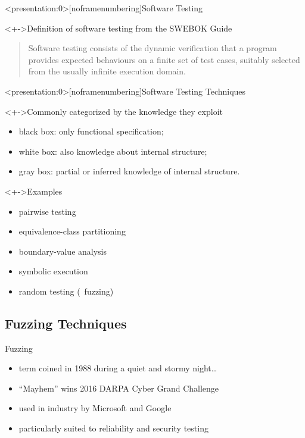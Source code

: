 \documentclass[handout]{beamer}
\begin{document}
\begin{frame}<presentation:0>[noframenumbering]{Software Testing}
    \begin{block}<+->{Definition of software testing from the SWEBOK Guide}
        \begin{quote}
            Software testing consists of the \alert{dynamic} verification that a
            program provides \alert{expected} behaviours on a \alert{finite} set
            of test cases, suitably \alert{selected} from the usually infinite
            execution domain.
        \end{quote}
    \end{block}
\end{frame}

\begin{frame}<presentation:0>[noframenumbering]{Software Testing Techniques}
    \begin{block}<+->{Commonly categorized by the knowledge they exploit}
        \begin{itemize}[<+->]
            \item{} black box: only functional specification;
            \item{} white box: also knowledge about internal structure;
            \item{} gray box: partial or inferred knowledge of internal structure.
        \end{itemize}
    \end{block}
    \begin{exampleblock}<+->{Examples}
        \begin{itemize}[<+->]
            \item{} pairwise testing
            \item{} equivalence-class partitioning
            \item{} boundary-value analysis
            \item{} symbolic execution
            \item{} random testing (\ie~\alert{fuzzing})
        \end{itemize}
    \end{exampleblock}
\end{frame}

\subsection{Fuzzing Techniques}

\begin{frame}{Fuzzing}
    \begin{itemize}[<+->]
        \item{} term coined in 1988 during a quiet and stormy night\ldots\
        \item{} ``Mayhem'' wins 2016 DARPA Cyber Grand Challenge
        \item{} used in industry by Microsoft and Google
        \item{} particularly suited to reliability and security testing
    \end{itemize}
\end{frame}
\end{document}
